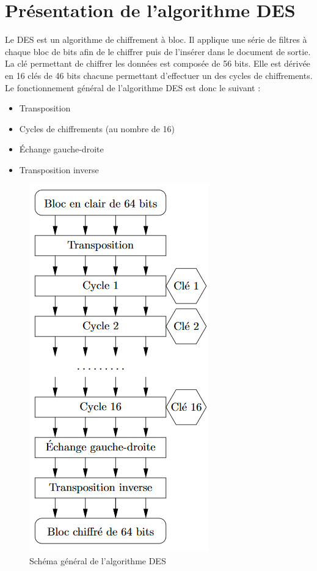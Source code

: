 \documentclass[a4paper]{article}
\begin{document}
\section{Présentation de l'algorithme DES}
Le DES est un algorithme de chiffrement à bloc. Il applique une série de filtres à chaque bloc de bits afin de le chiffrer puis de l'insérer dans le document de sortie.
\smallbreak
La clé permettant de chiffrer les données est composée de 56 bits. Elle est dérivée en 16 clés de 46 bits chacune permettant d'effectuer un des cycles de chiffrements. Le fonctionnement général de l'algorithme DES est donc le suivant :
\begin{itemize}
\item Transposition
\item Cycles de chiffrements (au nombre de 16)
\item Échange gauche-droite
\item Transposition inverse
\end{itemize}

\begin{figure}
\begin{center}
\includegraphics[scale=0.5]{images/des_structure.png} 
\caption{Schéma général de l'algorithme DES}
\end{center}
\end{figure}
\medbreak
\end{document}
